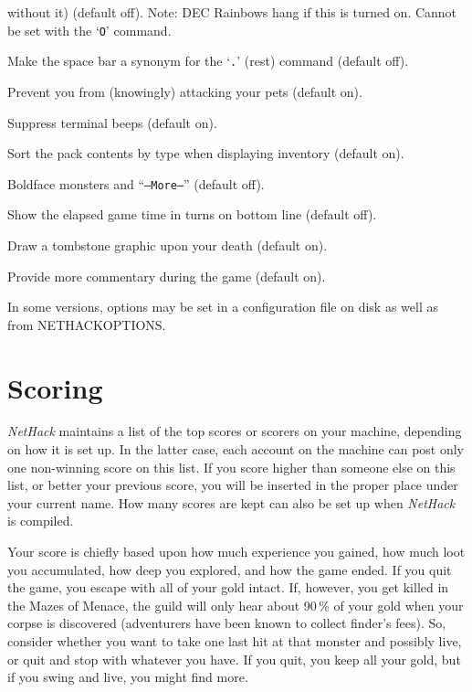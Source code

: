 without it) (default off).  Note:  DEC Rainbows hang if this is turned on.
Cannot be set with the `{\tt O}' command.
\item[\ib{rest\_on\_space}]
Make the space bar a synonym for the `{\tt .}' (rest) command (default off).
\item[\ib{safe\_pet}]
Prevent you from (knowingly) attacking your pets (default on).
\item[\ib{silent}]
Suppress terminal beeps (default on).
\item[\ib{sortpack}]
Sort the pack contents by type when displaying inventory (default on).
\item[\ib{standout}]
Boldface monsters and ``{\tt --More--}'' (default off).
\item[\ib{time}]
Show the elapsed game time in turns on bottom line (default off).
\item[\ib{tombstone}]
Draw a tombstone graphic upon your death (default on).
\item[\ib{verbose}]
Provide more commentary during the game (default on).
\elist

\nd In some versions, options may be set in a configuration file
on disk as well as from NETHACKOPTIONS.

\section{Scoring}

{\it NetHack\/} maintains a list of the top scores or scorers on your machine,
depending on how it is set up.  In the latter case, each account on
the machine can post only one non-winning score on this list.  If
you score higher than someone else on this list, or better your
previous score, you will be inserted in the proper place under your
current name.  How many scores are kept can also be set up when
{\it NetHack\/} is compiled.

Your score is chiefly based upon how much experience you gained, how
much loot you accumulated, how deep you explored, and how the game
ended.  If you quit the game, you escape with all of your gold intact.
If, however, you get killed in the Mazes of Menace, the guild will
only hear about 90\,\% of your gold when your corpse is discovered
(adventurers have been known to collect finder's fees).  So, consider
whether you want to take one last hit at that monster and possibly
live, or quit and stop with whatever you have.  If you quit, you keep
all your gold, but if you swing and live, you might find more.

